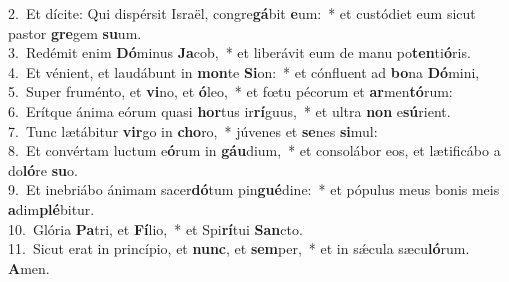 {2.~}Et dícite: Qui dispérsit Israël, congre\textbf{gá}bit \textbf{e}um:~* et custódiet eum sicut pastor \textbf{gre}gem \textbf{su}um.\\
{3.~}Redémit enim \textbf{Dó}minus \textbf{Ja}cob,~* et liberávit eum de manu po\textbf{ten}ti\textbf{ó}ris.\\
{4.~}Et vénient, et laudábunt in \textbf{mon}te \textbf{Si}on:~* et cónfluent ad \textbf{bo}na \textbf{Dó}mini,\\
{5.~}Super fruménto, et \textbf{vi}no, et \textbf{ó}leo,~* et fœtu pécorum et \textbf{ar}men\textbf{tó}rum:\\
{6.~}Erítque ánima eórum quasi \textbf{hor}tus ir\textbf{rí}guus,~* et ultra \textbf{non} e\textbf{sú}rient.\\
{7.~}Tunc lætábitur \textbf{vir}go in \textbf{cho}ro,~* júvenes et \textbf{se}nes \textbf{si}mul:\\
{8.~}Et convértam luctum e\textbf{ó}rum in \textbf{gáu}dium,~* et consolábor eos, et lætificábo a do\textbf{ló}re \textbf{su}o.\\
{9.~}Et inebriábo ánimam sacer\textbf{dó}tum pin\textbf{gué}dine:~* et pópulus meus bonis meis \textbf{a}dim\textbf{plé}bitur.\\
{10.~}Glória \textbf{Pa}tri, et \textbf{Fí}lio,~* et Spi\textbf{rí}tui \textbf{San}cto.\\
{11.~}Sicut erat in princípio, et \textbf{nunc}, et \textbf{sem}per,~* et in sǽcula sæcu\textbf{ló}rum. \textbf{A}men.\\
